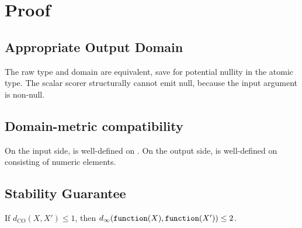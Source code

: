 \documentclass{article}
\begin{document}
\section{Proof}
\subsection{Appropriate Output Domain}
The raw type and domain are equivalent, save for potential nullity in the atomic type. 
The scalar scorer structurally cannot emit null, because the input argument is non-null.

\subsection{Domain-metric compatibility}
On the input side,  is well-defined on . 
On the output side,  is well-defined on  consisting of numeric elements.

\subsection{Stability Guarantee}


\begin{lemma}
    \label{single-change-stab}
    If $d_{CO}(X, X') \le 1$, then $d_\infty(\texttt{function}(X), \texttt{function}(X')) \le 2$.
\end{lemma}
\end{document}
